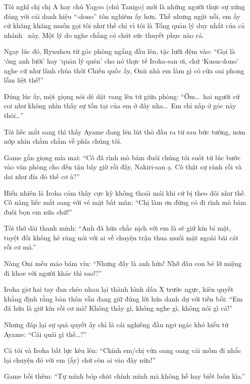 \documentclass[../main.tex]{subfiles}
\begin{document}
Tôi nghĩ chị chị A hay chú Yagoo (chú Tanigo) mới là những người thực sự xứng đáng với cái danh hiệu ``-dono'' tôn nghiêm ấy hơn. Thế nhưng ngặt nỗi, em ấy cứ khăng khăng muốn gọi tôi như thế chỉ vì tôi là Tổng quản lý duy nhất của cả nhánh \hll\ này. Một lý do nghe chẳng có chút sức thuyết phục nào cả.

Ngay lúc đó, Ryuuhou từ góc phòng ngẩng đầu lên, tặc lưỡi đệm vào: ``Gọi là `ông anh lười' hay `quản lý quèn' cho nó thực tế Iroha-san ơi, chứ `Kuon-dono' nghe cứ như lãnh chúa thời Chiến quốc ấy, Onii nhà em làm gì có cửa oai phong lẫm liệt thế!''

Đúng lúc ấy, một giọng nói dè dặt vang lên từ giữa phòng: ``Ờm\dots\ hai người cứ coi như không nhìn thấy sự tồn tại của em ở đây nha\dots\ Em chỉ nấp ở góc này thôi\dots''

Tôi liếc mắt sang thì thấy Ayame đang lén lút thò đầu ra từ sau bức tường, nơm nớp nhìn chằm chằm về phía chúng tôi.


Game gằn giọng mỉa mai: ``Cô đã rình mò bám đuôi chúng tôi suốt từ lúc bước vào văn phòng cho đến tận bây giờ rồi đấy, Nakiri-san ạ. Cô thật sự rảnh rỗi và dai như đỉa đó thế cơ à?''

Hiển nhiên là Iroha cảm thấy cực kỳ không thoải mái khi cứ bị theo dõi như thế. Cô nàng liếc mắt sang với vẻ mặt bất mãn: ``Chị làm ơn đừng có đi rình mò bám đuôi bọn em nữa chứ!''

Tôi thở dài thanh minh: ``Anh đã hứa chắc nịch với em là sẽ giữ kín bí mật, tuyệt đối không hé răng nói với ai về chuyện trận thua muối mặt ngoài bãi cát rồi cơ mà.''

Nàng Oni mếu máo bám víu: ``Nhưng đấy là anh hứa! Nhỡ đâu con bé lỡ miệng đi khoe với người khác thì sao!?''

Iroha giơ hai tay đan chéo nhau lại thành hình dấu X trước ngực, kiên quyết khẳng định rằng bản thân vẫn đang giữ đúng lời hứa danh dự với tiền bối: ``Em đã hứa là giữ kín rồi cơ mà! Không thấy gì, không nghe gì, không nói gì cả!''


Nhưng đáp lại sự quả quyết ấy chỉ là cái nghiêng đầu ngơ ngác khó hiểu từ Ayame: ``Cái quái gì thế\dots?''

Cả tôi và Iroha bất lực kêu lên: ``Chính em/chị vừa oang oang cái mồm đi nhắc lại chuyện đó với em (ấy) chứ còn ai vào đây nữa!''

Game bồi thêm: ``Tự mình bóp chát chính mình mà không hề hay biết luôn kìa.''
\end{document}
